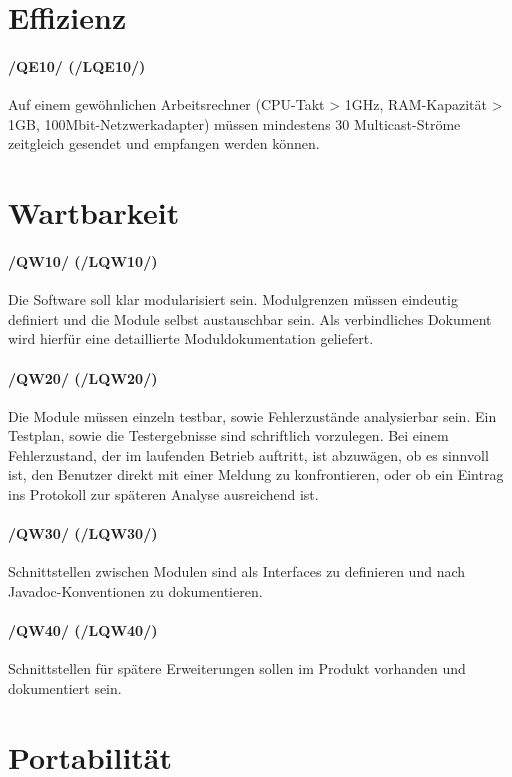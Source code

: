 \section{Effizienz}

\paragraph{/QE10/ (/LQE10/)} Auf einem gewöhnlichen Arbeitsrechner (CPU-Takt >
1GHz, RAM-Kapazität > 1GB, 100Mbit-Netzwerkadapter) müssen mindestens 30
Multicast-Ströme zeitgleich gesendet und empfangen werden können.

\section{Wartbarkeit}

\paragraph{/QW10/ (/LQW10/)} Die Software soll klar modularisiert sein.
Modulgrenzen müssen eindeutig definiert und die Module selbst austauschbar sein. Als
verbindliches Dokument wird hierfür eine detaillierte Moduldokumentation
geliefert.

\paragraph{/QW20/ (/LQW20/)} Die Module müssen einzeln testbar, sowie
Fehlerzustände analysierbar sein. Ein Testplan, sowie die Testergebnisse sind schriftlich
vorzulegen. Bei einem Fehlerzustand, der im laufenden Betrieb auftritt, ist
abzuwägen, ob es sinnvoll ist, den Benutzer direkt mit einer Meldung zu
konfrontieren, oder ob ein Eintrag ins Protokoll zur späteren Analyse
ausreichend ist.

\paragraph{/QW30/ (/LQW30/)} Schnittstellen zwischen Modulen sind als Interfaces
zu definieren und nach Javadoc-Konventionen zu dokumentieren.

\paragraph{/QW40/ (/LQW40/)} Schnittstellen für spätere Erweiterungen sollen im
Produkt vorhanden und dokumentiert sein.

\section{Portabilität}


